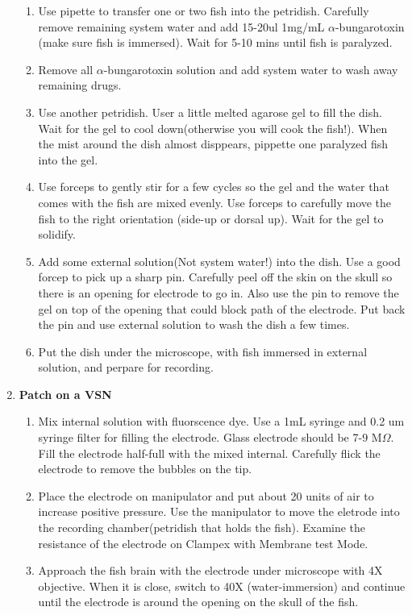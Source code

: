 \documentclass[11pt]{article}
\begin{document}
\begin{enumerate}[label=(\alph*)]
		\begin{enumerate}[label=\arabic*.]
			\item Use pipette to transfer one or two fish into the petridish. Carefully remove remaining system water and add 15-20ul 1mg/mL $\alpha$-bungarotoxin (make sure fish is immersed). Wait for 5-10 mins until fish is paralyzed.
			\item Remove all $\alpha$-bungarotoxin solution and add system water to wash away remaining drugs.
			\item Use another petridish. User a little melted agarose gel to fill the dish. Wait for the gel to cool down(otherwise you will cook the fish!). When the mist around the dish almost disppears, pippette one paralyzed fish into the gel.
			\item Use forceps to gently stir for a few cycles so the gel and the water that comes with the fish are mixed evenly. Use forceps to carefully move the fish to the right orientation (side-up or dorsal up). Wait for the gel to solidify. 
			\item Add some external solution(Not system water!) into the dish. Use a good forcep to pick up a sharp pin. Carefully peel off the skin on the skull so there is an opening for electrode to go in. Also use the pin to remove the gel on top of the opening that could block path of the electrode. Put back the pin and use external solution to wash the dish a few times.
			\item Put the dish under the microscope, with fish immersed in external solution, and perpare for recording.
		\end{enumerate}
		\item \textbf{Patch on a VSN}
		\begin{enumerate}[label=\arabic*.]
			\item Mix internal solution with fluorscence dye. Use a 1mL syringe and 0.2 um syringe filter for filling the electrode. Glass electrode should be 7-9 M$\Omega$. Fill the electrode half-full with the mixed internal. Carefully flick the electrode to remove the bubbles on the tip. 
			\item Place the electrode on manipulator and put about 20 units of air to increase positive pressure. Use the manipulator to move the eletrode into the recording chamber(petridish that holds the fish). Examine the resistance of the electrode on Clampex with Membrane test Mode.
			\item Approach the fish brain with the electrode under microscope with 4X objective. When it is close, switch to 40X (water-immersion) and continue until the electrode is around the opening on the skull of the fish. 

\end{enumerate}
\end{enumerate}
\end{document}
